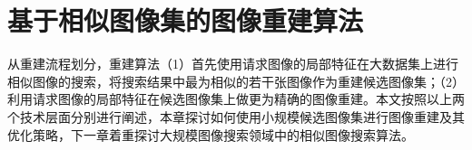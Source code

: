 

\chapter{基于相似图像集的图像重建算法}

从重建流程划分，重建算法（1）首先使用请求图像的局部特征在大数据集上进行相似图像的搜索，将搜索结果中最为相似的若干张图像作为重建候选图像集；（2）利用请求图像的局部特征在候选图像集上做更为精确的图像重建。本文按照以上两个技术层面分别进行阐述，本章探讨如何使用小规模候选图像集进行图像重建及其优化策略，下一章着重探讨大规模图像搜索领域中的相似图像搜索算法。




